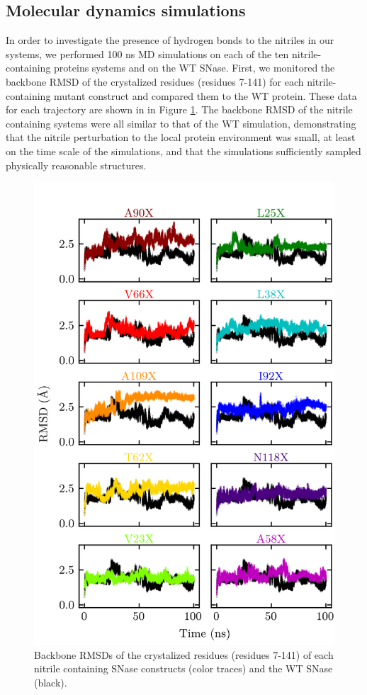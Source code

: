 \subsection{Molecular dynamics simulations}

In order to investigate the presence of hydrogen bonds to the nitriles in our systems, we performed 100 ns MD simulations on each of the ten nitrile-containing proteins systems and on the WT SNase. 
First, we monitored the backbone RMSD of the crystalized residues (residues 7-141) for each nitrile-containing mutant construct and compared them to the WT protein. 
These data for each trajectory are shown in in Figure \ref{fig:snase-rmsd}. 
The backbone RMSD of the nitrile containing systems were all similar to that of the WT simulation, demonstrating that the nitrile perturbation to the local protein environment was small, at least on the time scale of the simulations, and that the simulations sufficiently sampled physically reasonable structures.

\begin{figure}
    \center
    \includegraphics[width=\single]{figures-snase/rmsd.png}
    \caption[Backbobe RMSDs of nitrile containing SNase constructs]{
        Backbone RMSDs of the crystalized residues (residues 7-141) of each nitrile containing SNase constructs (color traces) and the WT SNase (black).
    }
    \label{fig:snase-rmsd}
\end{figure}


